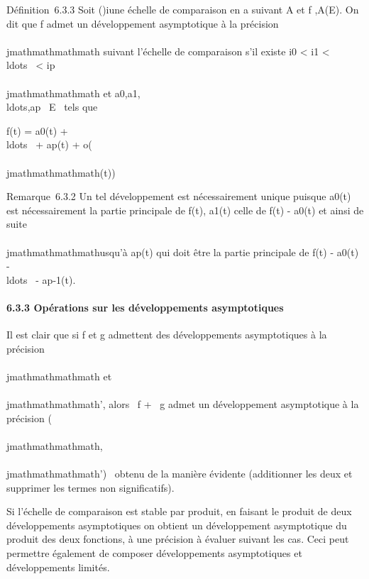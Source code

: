 Définition~6.3.3 Soit (\phii)i\inI une échelle de
comparaison en a suivant A et f ,A(E). On dit que f admet
un développement asymptotique à la précision \phi\\\\jmathmathmathmath suivant
l'échelle de comparaison s'il existe i0 \textless{}
i1 \textless{}
\\ldots~ \textless{}
ip \leq \\\\jmathmathmathmath et
a0,a1,\\ldots,ap~
\in E \diagdown\0\ tels que

f(t) = a0(t) +
\\ldots~ +
ap\phiip(t) + o(\phi\\\\jmathmathmathmath(t))

Remarque~6.3.2 Un tel développement est nécessairement unique puisque
a0(t) est nécessairement la partie
principale de f(t), a1(t) celle de f(t)
- a0(t) et ainsi de suite \\\\jmathmathmathmathusqu'à
ap\phiip(t) qui doit être la partie
principale de f(t) - a0(t)
-\\ldots~ -
ap-1(t).

\paragraph{6.3.3 Opérations sur les développements asymptotiques}

Il est clair que si f et g admettent des développements asymptotiques à
la précision \phi\\\\jmathmathmathmath et \phi\\\\jmathmathmathmath', alors \alpha~f + \beta~g admet un
développement asymptotique à la précision
\phimin(\\\\jmathmathmathmath,\\\\jmathmathmathmath')~ obtenu de la manière
évidente (additionner les deux et supprimer les termes non
significatifs).

Si l'échelle de comparaison est stable par produit, en faisant le
produit de deux développements asymptotiques on obtient un développement
asymptotique du produit des deux fonctions, à une précision à évaluer
suivant les cas. Ceci peut permettre également de composer
développements asymptotiques et développements limités.

